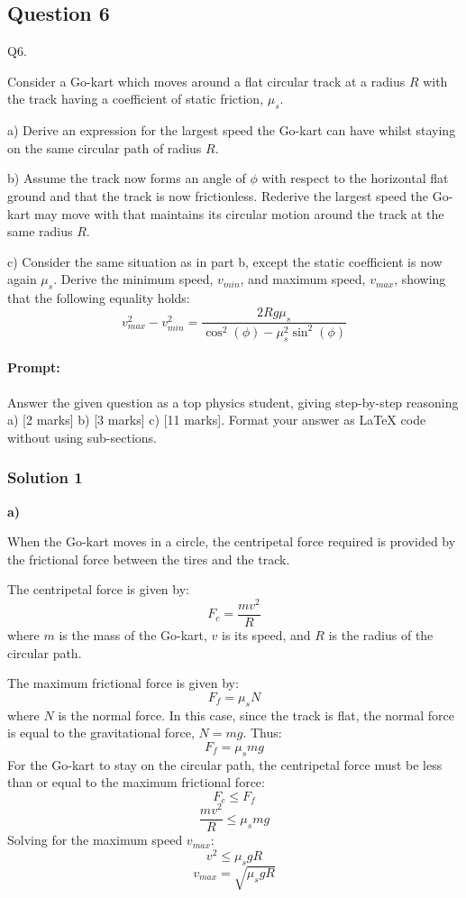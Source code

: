 \documentclass{article}
\begin{document}
\subsection{Question 6}
Q6.

Consider a Go-kart which moves around a flat circular track at a radius $R$ with the track having a
coefficient of static friction, $\mu_s$.

a) Derive an expression for the largest speed the Go-kart can have whilst staying on the same
circular path of radius $R$.

b) Assume the track now forms an angle of $\phi$ with respect to the horizontal flat ground and that
the track is now frictionless. Rederive the largest speed the Go-kart may move with that maintains
its circular motion around the track at the same radius $R$.

c) Consider the same situation as in part b, except the static coefficient is now again $\mu_s$. Derive
the minimum speed, $v_{min}$, and maximum speed, $v_{max}$, showing that the following equality holds:
$$v_{max}^2 - v_{min}^2 = \frac{2Rg\mu_s}{\cos^2(\phi) - \mu_s^2\sin^2(\phi)}$$

\paragraph{Prompt: \\} 
Answer the given question as a top physics student, giving step-by-step reasoning a) [2 marks] b) [3 marks] c) [11 marks]. Format your answer as LaTeX code without using sub-sections. 

\subsubsection{Solution 1}
\textbf{a)}

When the Go-kart moves in a circle, the centripetal force required is provided by the frictional force between the tires and the track.

The centripetal force is given by:
$$F_c = \frac{mv^2}{R}$$
where $m$ is the mass of the Go-kart, $v$ is its speed, and $R$ is the radius of the circular path.

The maximum frictional force is given by:
$$F_f = \mu_s N$$
where $N$ is the normal force. In this case, since the track is flat, the normal force is equal to the gravitational force, $N = mg$.
Thus:
$$F_f = \mu_s mg$$
For the Go-kart to stay on the circular path, the centripetal force must be less than or equal to the maximum frictional force:
$$F_c \le F_f$$
$$\frac{mv^2}{R} \le \mu_s mg$$
Solving for the maximum speed $v_{max}$:
$$v^2 \le \mu_s gR$$
$$v_{max} = \sqrt{\mu_s gR}$$
\end{document}
